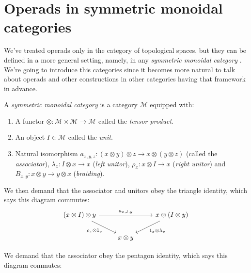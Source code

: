 \documentclass[TFM.tex]{subfiles}
\begin{document}

\section{Operads in symmetric monoidal categories}
We've treated operads only in the category of topological spaces, but they can be defined in a more general setting, namely, in any \emph{symmetric monoidal category} \cite{Yau}. We're going to introduce this categories since it becomes more natural to talk about operads and other constructions in other categories having that framework in advance.

\begin{defi}\label{monoidal}
A \emph{symmetric monoidal category} is a category $\mathscr{M}$ equipped with:
\begin{enumerate}[(1)]
\item A functor $\otimes: \mathscr{M}\times \mathscr{M}\to \mathscr{M}$ called the \emph{tensor product}.
\item An object $I\in \mathscr{M}$ called the \emph{unit}.
\item Natural isomorphism $a_{x,y,z} : (x \otimes y) \otimes z \to x \otimes (y \otimes z)$ (called the \emph{associator}), $\lambda_x : I \otimes x \to x$ (\emph{left unitor}), $\rho_x : x \otimes I \to x$ (\emph{right unitor}) and $B_{x,y}: x\otimes y\to y\otimes x$ (\emph{braiding}).
\end{enumerate}

We then demand that the associator and unitors obey the triangle identity, which says this diagram commutes:
\[
\begin{tikzcd}
(x\otimes I)\otimes y \arrow[rr, "{a_{x,I,y}}"] \arrow[rd, "\rho_x\otimes 1_y"'] &            & x\otimes (I\otimes y) \arrow[ld, "1_x\otimes\lambda_y"] \\
& x\otimes y &                                                        
\end{tikzcd}
\]

We demand that the associator obey the pentagon identity, which says this diagram commutes:


\end{defi}
\end{document}

